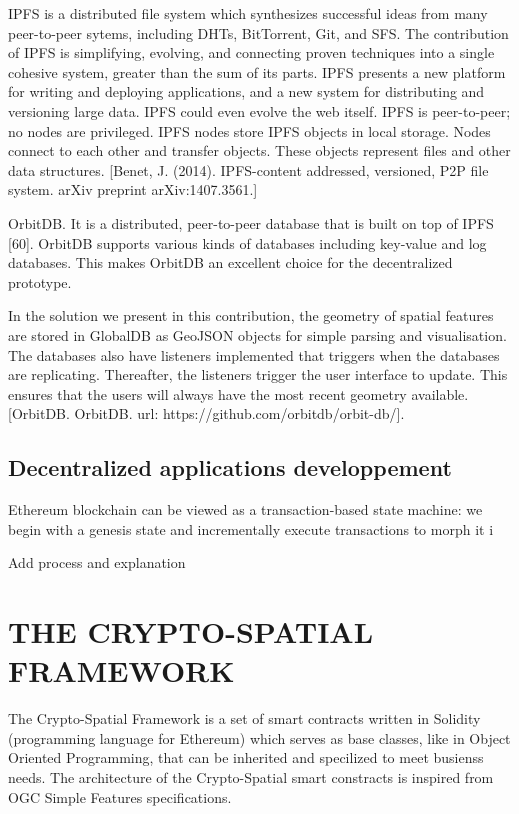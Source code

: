 \documentclass{isprs} %
\begin{document}
IPFS is a distributed file system which synthesizes successful ideas from many peer-to-peer sytems, including DHTs, BitTorrent, Git, and SFS. The contribution of IPFS is simplifying, evolving, and connecting proven techniques into a single cohesive system, greater than the sum of its parts. IPFS presents a new platform for writing and deploying applications, and a new system for distributing and versioning large data. IPFS could even evolve the web itself. IPFS is peer-to-peer; no nodes are privileged. IPFS nodes store IPFS objects in local storage. Nodes connect to each other and transfer objects. These objects represent files and other data structures. [Benet, J. (2014). IPFS-content addressed, versioned, P2P file system. arXiv preprint arXiv:1407.3561.]

OrbitDB. It is a distributed, peer-to-peer database that is built on top of IPFS [60]. OrbitDB supports various kinds of databases including key-value and log databases. This makes OrbitDB an excellent choice for the decentralized prototype. 

In the solution we present in this contribution, the geometry of spatial features are stored in GlobalDB as GeoJSON objects for simple parsing and visualisation. The databases also have listeners implemented that triggers when the databases are replicating. Thereafter, the listeners trigger the user interface to update. This ensures that the users will always have the most recent geometry available. [OrbitDB. OrbitDB. url: https://github.com/orbitdb/orbit-db/].


\subsection{Decentralized applications developpement}\label{sec:Decentralized applications developpement}

Ethereum blockchain can be viewed as a transaction-based state machine: we begin with a genesis state and incrementally execute transactions to morph it i

Add process and explanation

\newpage

\section{THE CRYPTO-SPATIAL FRAMEWORK}\label{sec:THE CRYPTO-SPATIAL FRAMEWORK}

The Crypto-Spatial Framework is a set of smart contracts written in Solidity (programming language for Ethereum) which serves as base classes, like in Object Oriented Programming, that can be inherited and specilized to meet busienss needs. The architecture of the Crypto-Spatial smart constracts is inspired from OGC Simple Features specifications. 
\end{document}
